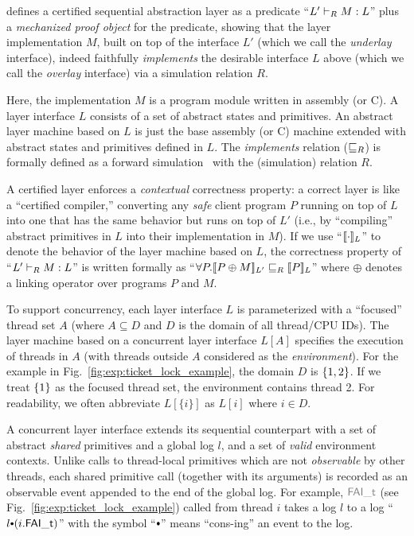 \citet{dscal15} defines
a certified sequential abstraction layer 
as a predicate 
``$\ltyp{L'}{R}{M}{L}$'' plus a \emph{mechanized proof object} for the predicate,
showing that the layer implementation $M$, built
on top of the interface $L'$ (which we call the {\em underlay}
interface), indeed faithfully {\em implements} the desirable interface
$L$ above (which we call the {\em overlay} interface) via a simulation
relation $R$.

Here, the implementation $M$ is a program module written in
assembly (or C). A layer interface $L$ consists of a set of abstract
states and primitives. An abstract layer machine based on $L$ is just
the base assembly (or C) machine extended with abstract states and
primitives defined in $L$.  The {\em implements} relation
($\refines_R$) is formally defined as a forward
simulation~\cite{Lynch95,leroy09,Milner71,Park81} with the
(simulation) relation $R$.

A certified layer enforces a {\em contextual} correctness property: a
correct layer is like a ``certified compiler,'' converting any {\em
  safe} client program $P$ running on top of $L$ into one that has the
same behavior but runs on top of $L'$ (i.e., by ``compiling'' abstract
primitives in $L$ into their implementation in $M$).  If we use
``$\sem{L}{\cdot}$'' to denote the behavior of the layer machine based on
$L$, the correctness property of ``$\ltyp{L'}{R}{M}{L}$'' is written
formally as ``$\forall{}P.\sem{L'}{P\oplus{}M} \refines_R \sem{L}{P}$''
where $\oplus$ denotes a linking operator over programs $P$ and $M$.




To support concurrency, each layer interface $L$ is parameterized
with a ``focused'' thread set $A$ (where $A \subseteq D$ and $D$ is
the domain of all thread/CPU IDs).  The layer machine
based on a concurrent layer interface $L[A]$ specifies
the execution of threads in $A$ (with threads
outside $A$ considered as the {\em environment}). For the example in Fig.~\ref{fig:exp:ticket_lock_example}, the domain $D$ is $\set{1, 2}$. If we treat $\set{1}$ as the focused thread set, the environment contains thread 2.
For readability,
we often abbreviate $L[\{i\}]$ as $L[i]$ where $i\in{}D$.

A concurrent layer interface extends its sequential counterpart
 with a
set of abstract {\em shared} primitives and a global log $l$, and a set of {\em valid} environment contexts.
Unlike calls to thread-local primitives
which are not {\em observable} by other threads, each shared primitive call (together with its arguments) is recorded as an
observable event appended to the end of the global log. 
For example, $\commc{FAI\_t}$ (see Fig.~\ref{fig:exp:ticket_lock_example}) called from thread
$i$ takes a log $l$ to a log ``$l \cons (i.\incticket)$'' with the symbol
``$\cons$'' means ``cons-ing'' an event to the log. 

